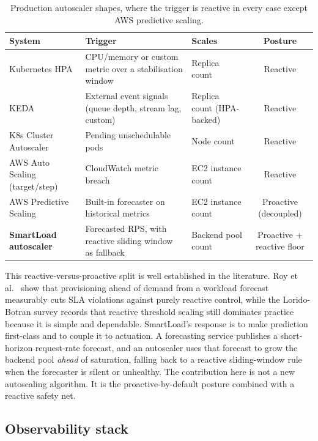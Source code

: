 \begin{table}[H]
\centering
\caption[Production autoscaler shapes and their triggers]{Production autoscaler shapes, where the trigger is reactive in every case except AWS predictive scaling.}
\label{lit:tab:autoscalers}
\small
\begin{tabularx}{\linewidth}{@{}lXlc@{}}
\toprule
\headrow
\textbf{System} & \textbf{Trigger} & \textbf{Scales} & \textbf{Posture} \\
\midrule
Kubernetes HPA \cite{k8shpa} &
CPU/memory or custom metric over a stabilisation window &
Replica count & Reactive \\
\addlinespace
KEDA \cite{keda} &
External event signals (queue depth, stream lag, custom) &
Replica count (HPA-backed) & Reactive \\
\addlinespace
K8s Cluster Autoscaler &
Pending unschedulable pods &
Node count & Reactive \\
\addlinespace
AWS Auto Scaling (target/step) &
CloudWatch metric breach &
EC2 instance count & Reactive \\
\addlinespace
AWS Predictive Scaling &
Built-in forecaster on historical metrics &
EC2 instance count & Proactive (decoupled) \\
\addlinespace
\textbf{SmartLoad autoscaler} &
Forecasted RPS, with reactive sliding window as fallback &
Backend pool count & Proactive + reactive floor \\
\bottomrule
\end{tabularx}
\end{table}

This reactive-versus-proactive split is well established in the literature.
Roy et al.\ \cite{roy2011autoscaling} show that provisioning ahead of demand
from a workload forecast measurably cuts SLA violations against purely reactive
control, while the Lorido-Botran survey \cite{lorido2014autoscaling} records
that reactive threshold scaling still dominates practice because it is simple
and dependable. SmartLoad's response is to make prediction first-class and to
couple it to actuation. A forecasting service publishes a short-horizon
request-rate forecast, and an autoscaler uses that forecast to grow the backend
pool \emph{ahead} of saturation, falling back to a reactive sliding-window rule
when the forecaster is silent or unhealthy. The contribution here is not a new
autoscaling algorithm. It is the proactive-by-default posture combined with a
reactive safety net.

\subsection{Observability stack}
\label{lit:sec:market-observability}

